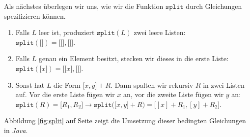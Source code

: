 \noindent
Als n\"achstes \"uberlegen wir uns, wie wir die Funktion $\texttt{split}$ durch Gleichungen spezifizieren k\"onnen.
\begin{enumerate}
\item Falls $L$ leer ist, produziert $\mathtt{split}(L)$ zwei leere Listen:\\[0.2cm]
      \hspace*{1.3cm} 
      $\mathtt{split}(\texttt{[]}) = \mathtt{[} \texttt{[]}, \texttt{[]} \mathtt{]}$.
\item Falls $L$ genau ein Element besitzt, stecken wir dieses in die erste Liste: \\[0.2cm]
      \hspace*{1.3cm} 
      $\mathtt{split}(\mathtt{[}x\mathtt{]}) = \mathtt{[} \texttt{[}x\texttt{]}, \texttt{[]} \mathtt{]}$.
\item Sonst hat $L$ die Form $\mathtt{[}x, y\mathtt{]} + R$.
      Dann spalten wir rekursiv $R$ in zwei Listen auf. Vor die erste Liste f\"ugen wir $x$ an,
      vor die zweite Liste f\"ugen wir $y$ an:
      \\[0.2cm]
      \hspace*{1.3cm} 
      $\mathtt{split}(R) = \mathtt{[}R_1, R_2\mathtt{]} \rightarrow
      \mathtt{split}\bigl(\mathtt{[}x, y\mathtt{]} + R\bigr) = \bigl[ [x] + R_1, [y] + R_2 \bigr]$.
\end{enumerate}
Abbildung \ref{fig:split} auf Seite \pageref{fig:split} 
zeigt die Umsetzung dieser bedingten Gleichungen in \textsl{Java}.


